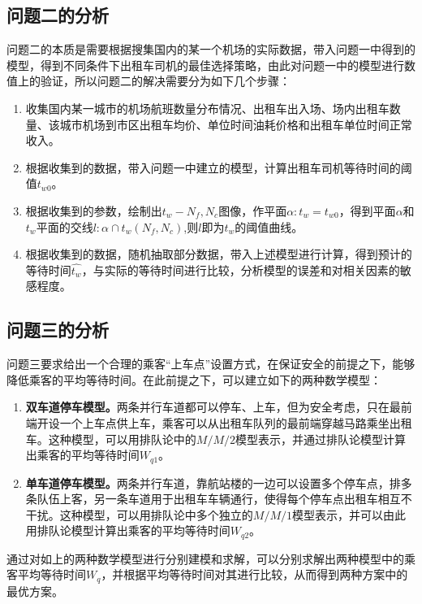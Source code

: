 \documentclass{cumcm}
\begin{document}
\subsection{问题二的分析}
问题二的本质是需要根据搜集国内的某一个机场的实际数据，带入问题一中得到的模型，得到不同条件下出租车司机的最佳选择策略，由此对问题一中的模型进行数值上的验证，所以问题二的解决需要分为如下几个步骤：
\begin{enumerate}[(1)]
	\item 收集国内某一城市的机场航班数量分布情况、出租车出入场、场内出租车数量、该城市机场到市区出租车均价、单位时间油耗价格和出租车单位时间正常收入。
	\item 根据收集到的数据，带入问题一中建立的模型，计算出租车司机等待时间的阈值$t_{w0}$。
	\item 根据收集到的参数，绘制出$t_w-N_f,N_c$图像，作平面$\alpha:t_w=t_{w0}$，得到平面$\alpha$和$t_w$平面的交线$l:\alpha\cap t_w(N_f,N_c)$,则$l$即为$t_w$的阈值曲线。
	\item 根据收集到的数据，随机抽取部分数据，带入上述模型进行计算，得到预计的等待时间$\hat{t_w}$，与实际的等待时间进行比较，分析模型的误差和对相关因素的敏感程度。
\end{enumerate}

\subsection{问题三的分析}
问题三要求给出一个合理的乘客“上车点”设置方式，在保证安全的前提之下，能够降低乘客的平均等待时间。在此前提之下，可以建立如下的两种数学模型：
\begin{enumerate}[(1)]
	\item \textbf{双车道停车模型。}两条并行车道都可以停车、上车，但为安全考虑，只在最前端开设一个上车点供上车，乘客可以从出租车队列的最前端穿越马路乘坐出租车。这种模型，可以用排队论中的$M/M/2$模型表示，并通过排队论模型计算出乘客的平均等待时间$W_{q1}$。
	\item \textbf{单车道停车模型。}两条并行车道，靠航站楼的一边可以设置多个停车点，排多条队伍上客，另一条车道用于出租车车辆通行，使得每个停车点出租车相互不干扰。这种模型，可以用排队论中多个独立的$M/M/1$模型表示，并可以由此用排队论模型计算出乘客的平均等待时间$W_{q2}$。
\end{enumerate}
\par
通过对如上的两种数学模型进行分别建模和求解，可以分别求解出两种模型中的乘客平均等待时间$W_q$，并根据平均等待时间对其进行比较，从而得到两种方案中的最优方案。
\end{document}
